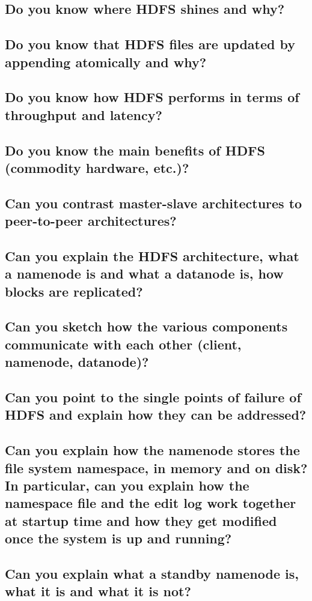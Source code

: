 \documentclass{article}
\begin{document}
\subsection{Do you know where HDFS shines and why?}
\subsection{Do you know that HDFS files are updated by appending atomically and why?}
\subsection{Do you know how HDFS performs in terms of throughput and latency?}
\subsection{Do you know the main benefits of HDFS (commodity hardware, etc.)?}
\subsection{Can you contrast master-slave architectures to peer-to-peer architectures?}
\subsection{Can you explain the HDFS architecture, what a namenode is and what a datanode is, how blocks are replicated?}
\subsection{Can you sketch how the various components communicate with each other (client, namenode, datanode)?}
\subsection{Can you point to the single points of failure of HDFS and explain how they can be addressed?}
\subsection{Can you explain how the namenode stores the file system namespace, in memory and on disk? In particular, can you explain how the namespace file and the edit log work together at startup time and how they get modified once the system is up and running?}
\subsection{Can you explain what a standby namenode is, what it is and what it is not?}
\end{document}

